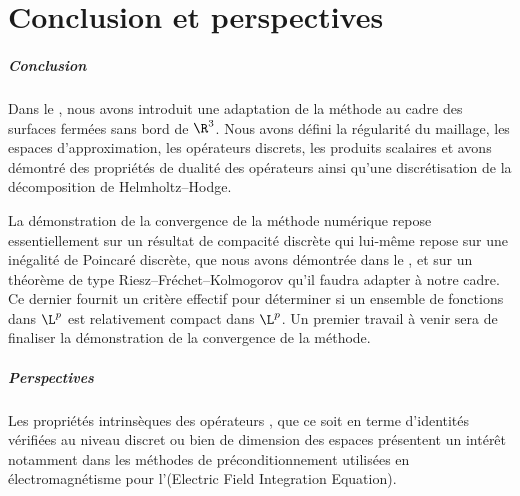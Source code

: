 \chapter*{Conclusion et perspectives}

\paragraph{Conclusion} Dans le , nous avons introduit une adaptation de la méthode \ddfv au cadre des surfaces fermées sans bord de $\R^3$. Nous avons défini la régularité du maillage, les espaces d'approximation, les opérateurs discrets, les produits scalaires et avons démontré des propriétés de dualité des opérateurs ainsi qu'une discrétisation de la décomposition de Helmholtz--Hodge.

La démonstration de la convergence de la méthode numérique repose essentiellement sur un résultat de compacité discrète qui lui-même repose sur une inégalité de Poincaré discrète, que nous avons démontrée dans le , et sur un théorème de type Riesz--Fréchet--Kolmogorov qu'il faudra adapter à notre cadre. Ce dernier fournit un critère effectif pour déterminer si un ensemble de fonctions dans $\L^p$ est relativement compact dans $\L^p$. Un premier travail à venir sera de finaliser la démonstration de la convergence de la méthode.

\paragraph{Perspectives} Les propriétés intrinsèques des opérateurs \ddfv, que ce soit en terme d’identités vérifiées au niveau discret ou bien de dimension des espaces présentent un intérêt notamment dans les méthodes de préconditionnement utilisées en électromagnétisme pour l’\efie (Electric Field Integration Equation).

